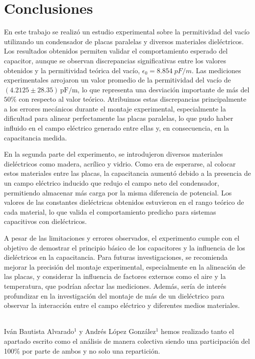 \documentclass[article,12pt]{elsarticle}
\begin{document}
\section{Conclusiones}
En este trabajo se realizó un estudio experimental sobre la permitividad del vacío utilizando un condensador de placas paralelas y diversos materiales dieléctricos. Los resultados obtenidos permiten validar el comportamiento esperado del capacitor, aunque se observan discrepancias significativas entre los valores obtenidos y la permitividad teórica del vacío, \(\epsilon_0 = 8.854 \; pF/m\). Las mediciones experimentales arrojaron un valor promedio de la permitividad del vacío de \((4.2125 \pm 28.35)\, \text{pF/m}\), lo que representa una desviación importante de más del $50\%$ con respecto al valor teórico. Atribuimos estas discrepancias principalmente a los errores mecánicos durante el montaje experimental, especialmente la dificultad para alinear perfectamente las placas paralelas, lo que pudo haber influido en el campo eléctrico generado entre ellas y, en consecuencia, en la capacitancia medida.

En la segunda parte del experimento, se introdujeron diversos materiales dieléctricos como madera, acrílico y vidrio. Como era de esperarse, al colocar estos materiales entre las placas, la capacitancia aumentó debido a la presencia de un campo eléctrico inducido que redujo el campo neto del condensador, permitiendo almacenar más carga por la misma diferencia de potencial. Los valores de las constantes dieléctricas obtenidos estuvieron en el rango teórico de cada material, lo que valida el comportamiento predicho para sistemas capacitivos con dieléctricos.

A pesar de las limitaciones y errores observados, el experimento cumple con el objetivo de demostrar el principio básico de los capacitores y la influencia de los dieléctricos en la capacitancia. Para futuras investigaciones, se recomienda mejorar la precisión del montaje experimental, especialmente en la alineación de las placas, y considerar la influencia de factores externos como el aire y la temperatura, que podrían afectar las mediciones. Además, sería de interés profundizar en la investigación del montaje de más de un dieléctrico para observar la interacción entre el campo eléctrico y diferentes medios materiales.

\newpage
{}\\ 

Iván Bautista Alvarado$^1$ y Andrés López González$^1$ hemos realizado tanto el apartado escrito como el análisis de manera colectiva siendo una participación del 100\% por parte de ambos y no solo una repartición.\\ 
\end{document}
